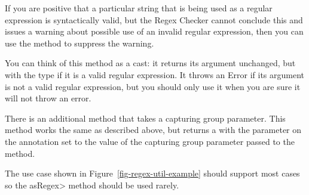 If you are positive that a particular string that is being used as a
regular expression is syntactically valid, but the Regex Checker cannot
conclude this and issues a warning about possible use of an invalid regular
expression, then you can use the
 method to suppress the
warning.

You can think of this method 
as a cast:  it returns its argument unchanged, but with the type
 if it is a valid regular expression.  It throws an
Error if its argument is not a valid regular expression, but you should
only use it when you are sure it will not throw an error.

There is an additional 
method that takes a capturing group parameter. This method works the same as
described above, but returns a  with the parameter on the
annotation set to the value of the capturing group parameter passed to the method.

The use case shown in Figure~\ref{fig-regex-util-example} should support most cases
so the \<asRegex> method should be used rarely.




